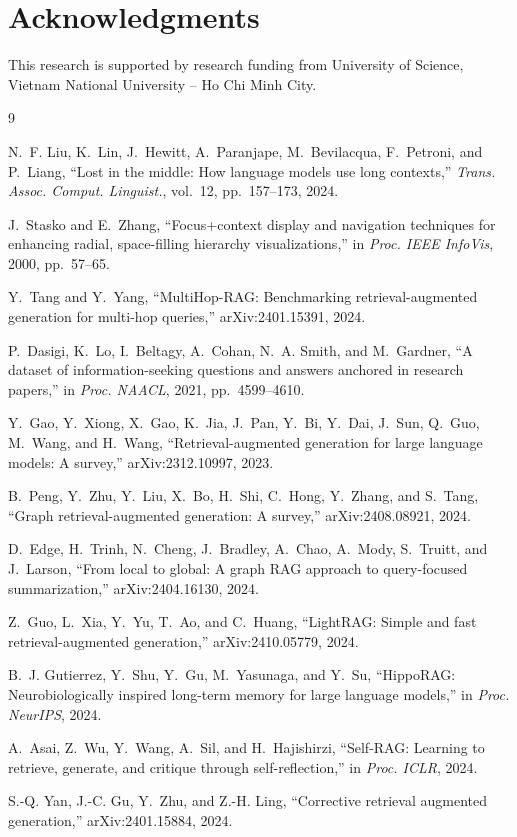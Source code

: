 \documentclass[conference,a4paper]{IEEEtran}
\begin{document}
\section*{Acknowledgments}
This research is supported by research funding from University of Science, Vietnam National University -- Ho Chi Minh City.

\begin{thebibliography}{9}

N.~F. Liu, K.~Lin, J.~Hewitt, A.~Paranjape, M.~Bevilacqua, F.~Petroni, and P.~Liang, ``Lost in the middle: How language models use long contexts,'' \emph{Trans. Assoc. Comput. Linguist.}, vol.~12, pp.~157--173, 2024.

J.~Stasko and E.~Zhang, ``Focus+context display and navigation techniques for enhancing radial, space-filling hierarchy visualizations,'' in \emph{Proc. IEEE InfoVis}, 2000, pp.~57--65.

Y.~Tang and Y.~Yang, ``MultiHop-RAG: Benchmarking retrieval-augmented generation for multi-hop queries,'' arXiv:2401.15391, 2024.

P.~Dasigi, K.~Lo, I.~Beltagy, A.~Cohan, N.~A. Smith, and M.~Gardner, ``A dataset of information-seeking questions and answers anchored in research papers,'' in \emph{Proc. NAACL}, 2021, pp.~4599--4610.

Y.~Gao, Y.~Xiong, X.~Gao, K.~Jia, J.~Pan, Y.~Bi, Y.~Dai, J.~Sun, Q.~Guo, M.~Wang, and H.~Wang, ``Retrieval-augmented generation for large language models: A survey,'' arXiv:2312.10997, 2023.

B.~Peng, Y.~Zhu, Y.~Liu, X.~Bo, H.~Shi, C.~Hong, Y.~Zhang, and S.~Tang, ``Graph retrieval-augmented generation: A survey,'' arXiv:2408.08921, 2024.

D.~Edge, H.~Trinh, N.~Cheng, J.~Bradley, A.~Chao, A.~Mody, S.~Truitt, and J.~Larson, ``From local to global: A graph RAG approach to query-focused summarization,'' arXiv:2404.16130, 2024.

Z.~Guo, L.~Xia, Y.~Yu, T.~Ao, and C.~Huang, ``LightRAG: Simple and fast retrieval-augmented generation,'' arXiv:2410.05779, 2024.

B.~J. Gutierrez, Y.~Shu, Y.~Gu, M.~Yasunaga, and Y.~Su, ``HippoRAG: Neurobiologically inspired long-term memory for large language models,'' in \emph{Proc. NeurIPS}, 2024.

A.~Asai, Z.~Wu, Y.~Wang, A.~Sil, and H.~Hajishirzi, ``Self-RAG: Learning to retrieve, generate, and critique through self-reflection,'' in \emph{Proc. ICLR}, 2024.

S.-Q. Yan, J.-C. Gu, Y.~Zhu, and Z.-H. Ling, ``Corrective retrieval augmented generation,'' arXiv:2401.15884, 2024.

\end{thebibliography}
\end{document}
